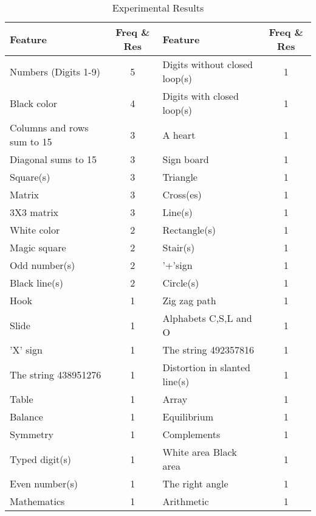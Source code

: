 \documentclass{llncs}
\newcommand{\tick}{\ding{52}}
\newcommand{\cross}{\ding{56}}
\begin{document}
\begin{table}
\caption{Experimental Results}

\begin{center} 
\begin{tabular}{|l|c|l|c|}
\hline
Feature&Freq \& Res&Feature&Freq \& Res\\
\hline
Numbers (Digits 1-9)&5 \tick\tick\tick&Digits without closed loop(s)&1 \tick\tick\tick\\
Black color&4 \tick\tick\tick&Digits with closed loop(s)&1 \tick\tick\tick\\
Columns and rows sum to 15&3 \tick\tick\tick&A heart&1 \tick\cross\tick\\
Diagonal sums to 15&3 \tick\tick\tick&Sign board&1 \tick\cross\cross\\
Square(s)&3 \tick\tick\tick&Triangle&1 \tick\cross\tick\\
Matrix&3 \tick\tick\tick&Cross(es)&1 \tick\cross\tick\\
3X3 matrix&3 \tick\tick\tick&Line(s)&1 \tick\tick\tick\\
White color&2 \tick\tick\tick&Rectangle(s)&1 \tick\tick\cross\\
Magic square&2 \tick\tick\tick&Stair(s)&1 \tick\tick\tick\\
Odd number(s)&2 \tick\tick\tick&'+'sign&1 \tick\tick\tick\\
Black line(s)&2 \tick\tick\tick&Circle(s)&1 \tick\tick\tick\\
Hook&1 \tick\cross\tick&Zig zag path&1 \tick\cross\tick\\
Slide&1 \tick\cross\tick&Alphabets C,S,L and O&1 \tick\cross\tick\\
'X' sign&1 \tick\cross\cross&The string 492357816&1 \tick\tick\tick\\
The string 438951276&1 \tick\tick\tick&Distortion in slanted line(s)&1 \tick\cross\tick\\
Table&1 \tick\cross\tick&Array&1 \tick\tick\tick\\
Balance&1 \cross\cross\cross&Equilibrium&1 \tick\cross\cross\\
Symmetry&1 \tick\tick\tick&Complements&1 \tick\tick\cross\\
Typed digit(s)&1 \tick\tick\tick&White area  Black area&1 \tick\tick\tick\\
Even number(s)&1 \tick\tick\tick&The right angle&1 \tick\tick\tick\\
Mathematics&1 \tick\tick\cross&Arithmetic&1 \tick\tick\cross\\
\hline
\end{tabular}
\end{center} 
\end{table}
\end{document}
